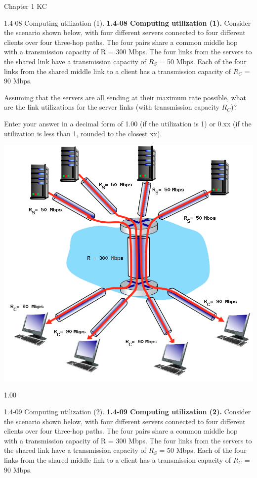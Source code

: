 \documentclass[a4paper]{article}
\begin{document}
\begin{quiz}{Chapter 1 KC}
\begin{shortanswer}[points=1]{1.4-08 Computing utilization (1).}
\textbf{1.4-08 Computing utilization (1).} 
Consider the scenario shown below, with four different servers connected to four different clients over four three-hop paths. The four pairs share a common middle hop with a transmission capacity of R = 300 Mbps. The four links from the servers to the shared link have a transmission capacity of $R_S$ = 50 Mbps. Each of the four links from the shared middle link to a client has a transmission capacity of $R_C$ = 90 Mbps. 

Assuming that the servers are all sending at their maximum rate possible, what are the link utilizations for the server links (with transmission capacity $R_C$)? 

Enter your answer in a decimal form of 1.00 (if the utilization is 1) or 0.xx (if the utilization is less than 1, rounded to the closest xx). 

\begin{center}
\includegraphics[width=\linewidth]{figs/1.4.7.png}
\end{center}
\item* 1.00
\end{shortanswer}

\begin{shortanswer}[points=1]{1.4-09 Computing utilization (2).}
\textbf{1.4-09 Computing utilization (2).} 
Consider the scenario shown below, with four different servers connected to four different clients over four three-hop paths. The four pairs share a common middle hop with a transmission capacity of R = 300 Mbps. The four links from the servers to the shared link have a transmission capacity of $R_S$ = 50 Mbps. Each of the four links from the shared middle link to a client has a transmission capacity of $R_C$ = 90 Mbps. 


\end{shortanswer}
\end{quiz}
\end{document}
